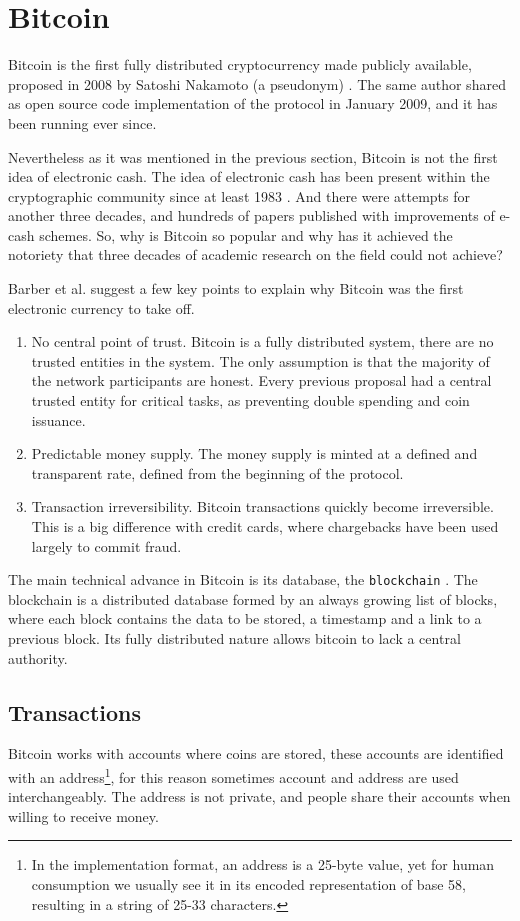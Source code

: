 \section{Bitcoin}
Bitcoin is the first fully distributed cryptocurrency made publicly available,
  proposed in 2008 by Satoshi Nakamoto (a pseudonym) \cite{nakamoto2008bitcoin}.
The same author shared as open source code implementation of the protocol in
  January 2009, and it has been running ever since.

Nevertheless as it was mentioned in the previous section, Bitcoin is not the
  first idea of electronic cash.
The idea of electronic cash has been present within the cryptographic community
  since at least 1983 \cite{chaum1983blind}.
And there were attempts for another three decades, and hundreds of papers
  published with improvements of e-cash schemes\cite{barber2012bitter}.
So, why is Bitcoin so popular and why has it achieved the notoriety that three
  decades of academic research on the field could not achieve?

Barber et al. \cite{barber2012bitter} suggest a few key points to explain why
  Bitcoin was the first electronic currency to take off.
\begin{enumerate}
\item No central point of trust.
	Bitcoin is a fully distributed system, there are no trusted entities in the
	  system. The only assumption is that the majority of the network participants
	  are honest. Every previous proposal had a central trusted entity for
	  critical tasks, as preventing double spending and coin issuance.
\item Predictable money supply.
	The money supply is minted at a defined and transparent rate, defined from
	  the beginning of the protocol.
\item Transaction irreversibility.
	Bitcoin transactions quickly become irreversible. This is a big difference
	  with credit cards, where chargebacks have been used largely to commit
	  fraud.
\end{enumerate}

  The main technical advance in Bitcoin is its database, the
  \texttt{blockchain} \cite{inventionblockchain,blockchainmostimportant}.
The blockchain is a distributed database formed by an always growing list of
  blocks, where each block contains the data to be stored, a timestamp and a
  link to a previous block. Its fully distributed nature allows bitcoin to lack
  a central authority.

\subsection{Transactions}\label{subsec:Transaction}
Bitcoin works with accounts where coins are stored, these accounts are
  identified with an address\footnote{In the implementation format, an address
    is a 25-byte value, yet for human consumption we usually see it in its
    encoded representation of base 58, resulting in a string of 25-33
    characters.}, for this reason sometimes account and address are used
    interchangeably.
The address is not private, and people share their accounts when willing to
  receive money.

